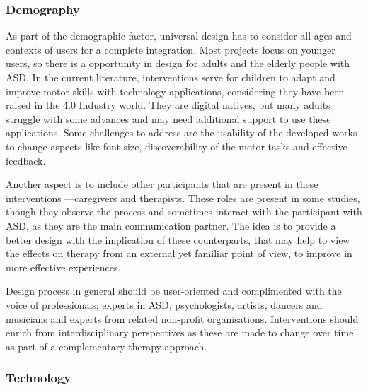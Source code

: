 \documentclass[a4paper,fleqn]{cas-sc}
\begin{document}
\subsubsection{Demography}

As part of the demographic factor, universal design has to consider all ages and contexts of users for a complete integration. Most projects focus on younger users, so there is a opportunity in design for adults and the elderly people with ASD. In the current literature, interventions serve for children to adapt and improve motor skills with technology applications, considering they have been raised in the 4.0 Industry world. They are digital natives, but many adults struggle with some advances and may need additional support to use these applications. Some challenges to address are the usability of the developed works to change aspects like font size, discoverability of the motor tasks and effective feedback.

Another aspect is to include other participants that are present in these interventions —caregivers and therapists. These roles are present in some studies, though they observe the process and sometimes interact with the participant with ASD, as they are the main communication partner. The idea is to provide a better design with the implication of these counterparts, that may help to view the effects on therapy from an external yet familiar point of view, to improve in more effective experiences.

Design process in general should be user-oriented and complimented with the voice of professionals: experts in ASD, psychologists, artists, dancers and musicians and experts from related non-profit organisations. Interventions should enrich from interdisciplinary perspectives as these are made to change over time as part of a complementary therapy approach.

\subsubsection{Technology}
\end{document}
